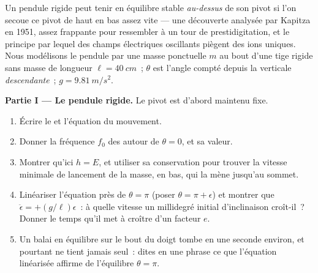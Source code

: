 \begin{problem}\label{pb:b3:lagrangian-mechanics:1}
Un pendule rigide peut tenir en équilibre stable \emph{au-dessus} de
son pivot si l'on secoue ce pivot de haut en bas assez vite --- une
découverte analysée par Kapitza en 1951, assez frappante pour
ressembler à un tour de prestidigitation, et le principe par lequel des
champs électriques oscillants piègent des ions uniques. Nous modélisons
le pendule par une masse ponctuelle $m$ au bout d'une tige rigide sans
masse de longueur $\ell = \qty{40}{cm}$~; $\theta$ est l'angle compté
depuis la verticale \emph{descendante}~; $g = \qty{9.81}{m/s^2}$.

\medskip\noindent\textbf{Partie I --- Le pendule rigide.}
Le pivot est d'abord maintenu fixe.
\begin{enumerate}
  \item Écrire le  et l'équation du mouvement.
  \item Donner la fréquence $f_0$ des  autour de $\theta =
        0$, et sa valeur.
  \item Montrer qu'ici $h = E$, et utiliser sa conservation pour
        trouver la vitesse minimale de lancement de la masse, en bas,
        qui la mène jusqu'au sommet.
  \item Linéariser l'équation près de $\theta = \pi$ (poser $\theta = \pi +
        \epsilon$) et montrer que $\ddot\epsilon = +(g/\ell)\epsilon$~:
        à quelle vitesse un millidegré initial d'inclinaison croît-il~?
        Donner le temps qu'il met à croître d'un facteur $e$.
  \item Un balai en équilibre sur le bout du doigt tombe en une seconde
        environ, et pourtant ne tient jamais seul~: dites en une phrase
        ce que l'équation linéarisée affirme de l'équilibre $\theta = \pi$.
\end{enumerate}


\end{problem}
